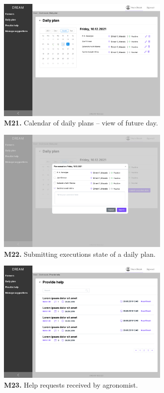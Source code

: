 \begin{figure}[H]
    \centering
    \includegraphics[width=0.75\textwidth]{mockups/Agronomist_Dashboard_Visit plan in future.png}
    \caption{\textbf{M21.} Calendar of daily plans – view of future day.}
\end{figure}

\begin{figure}[H]
    \centering
    \includegraphics[width=0.75\textwidth]{mockups/Agronomist_Dashboard_Visit plan_Submit.png}
    \caption{\textbf{M22.} Submitting executions state of a daily plan.}
\end{figure}

\begin{figure}[H]
    \centering
    \includegraphics[width=0.75\textwidth]{mockups/Agronomist_Dashboard_Provide help.png}
    \caption{\textbf{M23.} Help requests received by agronomist.}
\end{figure}

